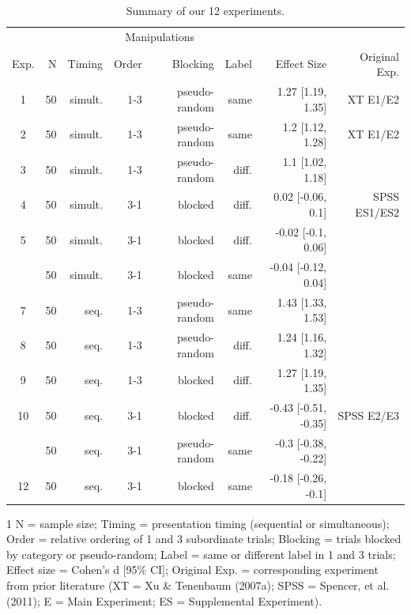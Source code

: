 \documentclass[english,floatsintext,man]{apa6}
\theoremstyle{definition}
\theoremstyle{definition}
\theoremstyle{remark}
\begin{document}
\begin{table}

\begin{threeparttable}
\caption{\label{tab:unnamed-chunk-2}Summary of our 12 experiments.}
\centering
\fontsize{12}{14}\selectfont
\begin{tabular}[t]{crrrrrrr}
\toprule
\multicolumn{2}{c}{ } & \multicolumn{4}{c}{Manipulations} & \multicolumn{1}{c}{ } \\
\cmidrule(l{2pt}r{2pt}){3-6}
Exp. & N & Timing & Order & Blocking & Label & Effect Size & Original 
Exp.\\
\midrule
1 & 50 & simult. & 1-3 & pseudo-random & same & 1.27 [1.19, 1.35] & XT E1/E2\\
2 & 50 & simult. & 1-3 & pseudo-random & same & 1.2 [1.12, 1.28] & XT E1/E2\\
3 & 50 & simult. & 1-3 & pseudo-random & diff. & 1.1 [1.02, 1.18] & \\
4 & 50 & simult. & 3-1 & blocked & diff. & 0.02 [-0.06, 0.1] & SPSS ES1/ES2\\
5 & 50 & simult. & 3-1 & blocked & diff. & -0.02 [-0.1, 0.06] & \\
\addlinespace
6 & 50 & simult. & 3-1 & blocked & same & -0.04 [-0.12, 0.04] & \\
7 & 50 & seq. & 1-3 & pseudo-random & same & 1.43 [1.33, 1.53] & \\
8 & 50 & seq. & 1-3 & pseudo-random & diff. & 1.24 [1.16, 1.32] & \\
9 & 50 & seq. & 1-3 & blocked & diff. & 1.27 [1.19, 1.35] & \\
10 & 50 & seq. & 3-1 & blocked & diff. & -0.43 [-0.51, -0.35] & SPSS E2/E3\\
\addlinespace
11 & 50 & seq. & 3-1 & pseudo-random & same & -0.3 [-0.38, -0.22] & \\
12 & 50 & seq. & 3-1 & blocked & same & -0.18 [-0.26, -0.1] & \\
\bottomrule
\end{tabular}
\begin{tablenotes}
\small
\item [1] N = sample size; Timing = presentation timing (sequential or simultaneous); Order = relative ordering of 1 and 3 subordinate trials; Blocking = trials blocked by category or pseudo-random; Label = same or different label in 1 and 3 trials; Effect size = Cohen's d [95\% CI]; Original Exp. = corresponding experiment from prior literature (XT = Xu \& Tenenbaum (2007a); SPSS =   Spencer, et al. (2011);  E = Main  Experiment; ES = Supplemental Experiment).
\end{tablenotes}
\end{threeparttable}
\end{table}
\end{document}
